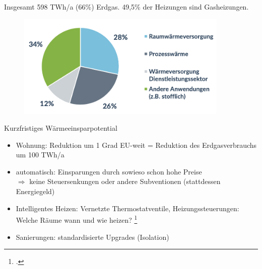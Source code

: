 \documentclass[10pt]{beamer}
\begin{document}
\begin{frame}
Insgesamt 598 TWh/a (66\%) Erdgas. 49,5\% der Heizungen sind Gasheizungen.

\begin{figure}
\includegraphics[width=0.9\textwidth]{fig/einsatz_erdgas.png}

\scriptsize{}
\end{figure}
\end{frame}


\begin{frame}{Kurzfristiges Wärmeeinsparpotential}
  \small{
  \begin{itemize}
    \item Wohnung: Reduktion um 1 Grad EU-weit = Reduktion des Erdgasverbrauchs um 100 TWh/a 
    \item automatisch: Einsparungen durch sowieso schon hohe Preise  \\
      $\Rightarrow$ keine Steuersenkungen oder andere Subventionen (stattdessen Energiegeld) 
    \item Intelligentes Heizen: Vernetzte Thermostatventile, Heizungssteuerungen: Welche Räume wann und wie heizen? \footcite{clausen2022}
    \item Sanierungen: standardisierte Upgrades (Isolation) 
  \end{itemize}
  }
\end{frame}
\end{document}
